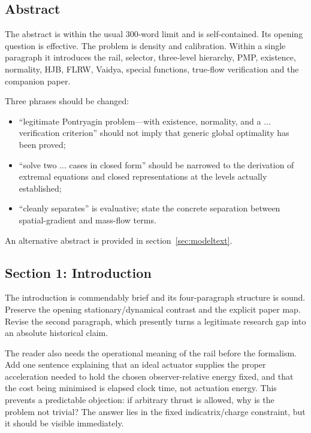 \documentclass[11pt,a4paper]{article}
\begin{document}
\subsection{Abstract}

The abstract is within the usual 300-word limit and is self-contained.  Its opening question is
effective.  The problem is density and calibration.  Within a single paragraph it introduces the
rail, selector, three-level hierarchy, PMP, existence, normality, HJB, FLRW, Vaidya, special
functions, true-flow verification and the companion paper.

Three phrases should be changed:

\begin{itemize}
  \item ``legitimate Pontryagin problem---with existence, normality, and a ... verification
  criterion'' should not imply that generic global optimality has been proved;
  \item ``solve two ... cases in closed form'' should be narrowed to the derivation of extremal
  equations and closed representations at the levels actually established;
  \item ``cleanly separates'' is evaluative; state the concrete separation between spatial-gradient
  and mass-flow terms.
\end{itemize}

An alternative abstract is provided in section~\ref{sec:modeltext}.

\subsection{Section 1: Introduction}

The introduction is commendably brief and its four-paragraph structure is sound.  Preserve the
opening stationary/dynamical contrast and the explicit paper map.  Revise the second paragraph,
which presently turns a legitimate research gap into an absolute historical claim.

The reader also needs the operational meaning of the rail before the formalism.  Add one sentence
explaining that an ideal actuator supplies the proper acceleration needed to hold the chosen
observer-relative energy fixed, and that the cost being minimised is elapsed clock time, not
actuation energy.  This prevents a predictable objection: if arbitrary thrust is allowed, why is
the problem not trivial?  The answer lies in the fixed indicatrix/charge constraint, but it should
be visible immediately.
\end{document}
